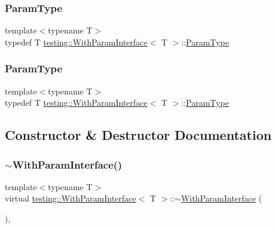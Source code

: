 \subsubsection{\texorpdfstring{ParamType}{ParamType}\hspace{0.1cm}{\footnotesize\ttfamily [2/3]}}
{\footnotesize\ttfamily template$<$typename T$>$ \\
typedef T \mbox{\hyperlink{classtesting_1_1_with_param_interface}{testing\+::\+With\+Param\+Interface}}$<$ T $>$\+::\mbox{\hyperlink{classtesting_1_1_with_param_interface_a343febaaebf1f025bda484f841d4fec1}{Param\+Type}}}

\mbox{\label{classtesting_1_1_with_param_interface_a343febaaebf1f025bda484f841d4fec1}} 
\subsubsection{\texorpdfstring{ParamType}{ParamType}\hspace{0.1cm}{\footnotesize\ttfamily [3/3]}}
{\footnotesize\ttfamily template$<$typename T$>$ \\
typedef T \mbox{\hyperlink{classtesting_1_1_with_param_interface}{testing\+::\+With\+Param\+Interface}}$<$ T $>$\+::\mbox{\hyperlink{classtesting_1_1_with_param_interface_a343febaaebf1f025bda484f841d4fec1}{Param\+Type}}}



\subsection{Constructor \& Destructor Documentation}
\mbox{\label{classtesting_1_1_with_param_interface_a4e170bd42fa5e8ce48b80cee6bb52e26}} 
\subsubsection{\texorpdfstring{$\sim$WithParamInterface()}{~WithParamInterface()}\hspace{0.1cm}{\footnotesize\ttfamily [1/3]}}
{\footnotesize\ttfamily template$<$typename T$>$ \\
virtual \mbox{\hyperlink{classtesting_1_1_with_param_interface}{testing\+::\+With\+Param\+Interface}}$<$ T $>$\+::$\sim$\mbox{\hyperlink{classtesting_1_1_with_param_interface}{With\+Param\+Interface}} (\begin{DoxyParamCaption}{ }\end{DoxyParamCaption})\hspace{0.3cm}{\ttfamily [inline]}, {\ttfamily [virtual]}}

